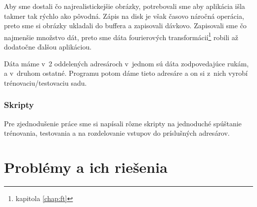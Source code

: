 Aby sme dostali čo najrealistickejšie obrázky, potrebovali sme aby aplikácia išla takmer tak rýchlo ako pôvodná. Zápis na disk je však časovo náročná operácia, preto sme si obrázky ukladali do buffera a zapisovali dávkovo. Zapisovali sme čo najmenšie množstvo dát, preto sme dáta fourierových transformácií\footnote{kapitola \ref{chap:ft} } robili až dodatočne ďalšou aplikáciou.

Dáta máme v~2 oddelených adresároch v~jednom sú dáta zodpovedajúce rukám, a v~druhom ostatné. Programu potom dáme tieto adresáre a on si z~nich vyrobí trénovaciu/testovaciu sadu.


\todo

\subsubsection{Skripty}
Pre zjednodušenie práce sme si napísali rôzne skripty na jednoduché spúštanie trénovania, testovania a na rozdelovanie vstupov do príslušných adresárov.
\todo

\section{Problémy a ich riešenia}
\todo